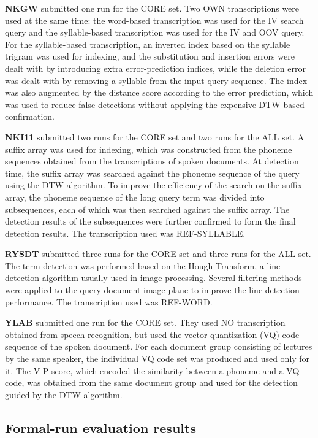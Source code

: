 \documentclass[english]{jnlp_1.4}
\begin{document}
{\bf NKGW} \cite{NKGW} submitted one run for the CORE set. Two OWN
transcriptions were used at the same time: the word-based
transcription was used for the IV search query and the
syllable-based transcription was used for the IV and OOV
query.  For the syllable-based transcription, an
inverted index based on the syllable trigram was used for indexing,
and the substitution and insertion errors were dealt with by
introducing extra error-prediction indices, while the deletion
error was dealt with by removing a syllable from the input query
sequence. The index was also augmented by the distance score according
to the error prediction, which was used to reduce false detections
without applying the expensive DTW-based confirmation.

{\bf NKI11} \cite{NKI11} submitted two runs for the CORE set and two
runs for the ALL set. A suffix array was used for indexing, which
was constructed from the phoneme sequences obtained from the
transcriptions of spoken documents. At detection time, the suffix
array was searched against the phoneme sequence of the query using
the DTW algorithm. To improve the efficiency of the search on the suffix
array, the phoneme sequence of the long query term was divided into
subsequences, each of which was then searched against the suffix
array. The detection results of the subsequences were further
confirmed to form the final detection results. The transcription used
was REF-SYLLABLE.

{\bf RYSDT} \cite{RYSDT} submitted three runs for the CORE set and
three runs for the ALL set.  The term detection was performed based on
the Hough Transform, a line detection algorithm usually used in image
processing. Several filtering methods were applied to the
query document image plane to improve the line detection
performance. The transcription used was REF-WORD.

{\bf YLAB} \cite{YLAB} submitted one run for the CORE set. They used NO
transcription obtained from speech recognition, but used the vector
quantization (VQ) code sequence of the spoken document. For each
document group 
consisting of lectures by the same speaker, the individual VQ code
set was produced and used only for it. The V-P score, which encoded
the similarity between a phoneme and a VQ code, was obtained from the
same document group and used for the detection guided by the DTW
algorithm.


\subsection{Formal-run evaluation results}
\end{document}
